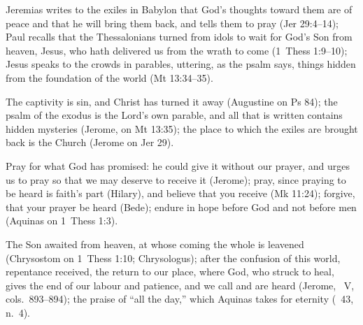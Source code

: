 \begin{fourSenses}
\item[Literal.] Jeremias writes to the exiles in Babylon that God's thoughts
toward them are of peace and that he will bring them back, and tells them to
pray (Jer 29:4--14); Paul recalls that the Thessalonians turned from idols to
wait for God's Son from heaven, Jesus, who hath delivered us from the wrath to
come (1~Thess 1:9--10); Jesus speaks to the crowds in parables, uttering, as
the psalm says,
things hidden from the foundation of the world (Mt 13:34--35).
\item[Allegorical.] The captivity is sin, and Christ has turned it away
(Augustine on Ps 84); the psalm of the exodus is the Lord's own parable, and
all that is written contains hidden mysteries (Jerome, on Mt 13:35); the place
to which the exiles are brought back is the Church (Jerome on Jer 29).
\item[Moral.] Pray for what God has promised: he could give it without our
prayer, and urges us to pray so that we may deserve to receive it (Jerome);
pray, since praying to be heard is faith's part (Hilary), and believe that you
receive (Mk 11:24); forgive, that
your prayer be heard (Bede); endure in hope before God and not before men
(Aquinas on 1~Thess 1:3).
\item[Anagogical.] The Son awaited from heaven, at whose coming the whole is
leavened (Chrysostom on 1~Thess 1:10; Chrysologus); after the confusion of this
world, repentance received, the return to our place, where God, who struck to
heal, gives the end of our labour and patience, and we call and are heard
(Jerome, ~V, cols.~893--894); the praise of ``all the day,''
which Aquinas takes for eternity (~43, n.~4).
\end{fourSenses}
